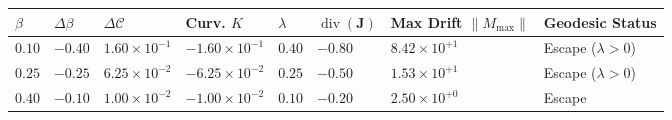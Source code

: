 \documentclass[
  11pt,
]{article}
\newcounter{none} %
\begin{document}
{\def\LTcaptype{none} %
\begin{longtable}[]{@{}
  >{\centering\arraybackslash}p{}
  >{\centering\arraybackslash}p{}
  >{\centering\arraybackslash}p{}
  >{\centering\arraybackslash}p{}
  >{\centering\arraybackslash}p{}
  >{\centering\arraybackslash}p{}
  >{\centering\arraybackslash}p{}
  >{\raggedright\arraybackslash}p{}@{}}
\toprule\noalign{}
\begin{minipage}[b]{\linewidth}\centering
\(\beta\)
\end{minipage} & \begin{minipage}[b]{\linewidth}\centering
\(\Delta \beta\)
\end{minipage} & \begin{minipage}[b]{\linewidth}\centering
\(\Delta \mathcal{C}\)
\end{minipage} & \begin{minipage}[b]{\linewidth}\centering
Curv. \(K\)
\end{minipage} & \begin{minipage}[b]{\linewidth}\centering
\(\lambda\)
\end{minipage} & \begin{minipage}[b]{\linewidth}\centering
\(\operatorname{div}(\mathbf{J})\)
\end{minipage} & \begin{minipage}[b]{\linewidth}\centering
Max Drift \(\|M_{\max}\|\)
\end{minipage} & \begin{minipage}[b]{\linewidth}\raggedright
Geodesic Status
\end{minipage} \\
\midrule\noalign{}
\endhead
\bottomrule\noalign{}
\endlastfoot
\(0.10\) & \(-0.40\) & \(1.60\times 10^{-1}\) & \(-1.60\times 10^{-1}\)
& \(0.40\) & \(-0.80\) & \(8.42\times 10^{+1}\) & Escape
(\(\lambda>0\)) \\
\(0.25\) & \(-0.25\) & \(6.25\times 10^{-2}\) & \(-6.25\times 10^{-2}\)
& \(0.25\) & \(-0.50\) & \(1.53\times 10^{+1}\) & Escape
(\(\lambda>0\)) \\
\(0.40\) & \(-0.10\) & \(1.00\times 10^{-2}\) & \(-1.00\times 10^{-2}\)
& \(0.10\) & \(-0.20\) & \(2.50\times 10^{+0}\) & Escape

\end{longtable}}
\end{document}
